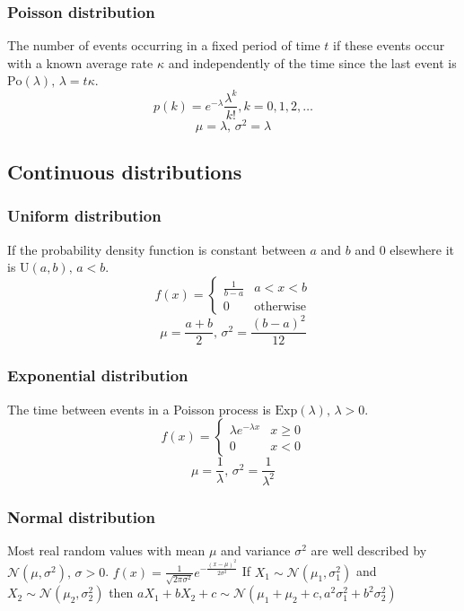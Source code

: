 \subsubsection{Poisson distribution}
The number of events occurring in a fixed period of time $t$ if these events occur with a known average rate $\kappa$ and independently of the time since the last event is $\textrm{Po}(\lambda),\,\lambda=t\kappa$.
\[p(k)=e^{-\lambda}\frac{\lambda^k}{k!}, k=0,1,2,\dots\]
\[\mu=\lambda,\,\sigma^2=\lambda\]

\subsection{Continuous distributions}

\subsubsection{Uniform distribution}
If the probability density function is constant between $a$ and $b$ and 0 elsewhere it is $\textrm{U}(a,b),\,a<b$.
\[f(x) = \left\{
\begin{array}{cl}
\frac{1}{b-a} & a<x<b\\
0 & \textrm{otherwise}
\end{array}\right.\]
\[\mu=\frac{a+b}{2},\,\sigma^2=\frac{(b-a)^2}{12}\]

\subsubsection{Exponential distribution}
The time between events in a Poisson process is $\textrm{Exp}(\lambda),\,\lambda>0$.
\[f(x) = \left\{
\begin{array}{cl}
\lambda e^{-\lambda x} & x\geq0\\
0 & x<0
\end{array}\right.\]
\[\mu=\frac{1}{\lambda},\,\sigma^2=\frac{1}{\lambda^2}\]

\subsubsection{Normal distribution}
Most real random values with mean $\mu$ and variance $\sigma^2$ are well described by $\mathcal{N}(\mu,\sigma^2),\,\sigma>0$.
$f(x) = \frac{1}{\sqrt{2\pi\sigma^2}}e^{-\frac{(x-\mu)^2}{2\sigma^2}}$
If $X_1 \sim \mathcal{N}(\mu_1,\sigma_1^2)$ and $X_2 \sim \mathcal{N}(\mu_2,\sigma_2^2)$ then
$aX_1 + bX_2 + c \sim \mathcal{N}(\mu_1+\mu_2+c,a^2\sigma_1^2+b^2\sigma_2^2)$